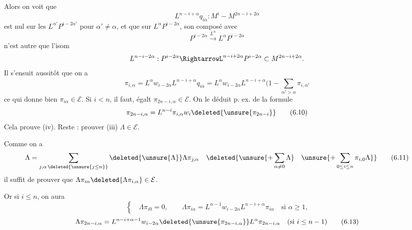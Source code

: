 Alors on voit que
\[
L^{n-i+\alpha}q_{i\alpha}:M^i-M^{2n-i+2\alpha}
\]
est nul sur les $L^{\alpha'}P^{i-2\alpha'}$ pour $\alpha'\neq\alpha$, et que sur $L^\alpha P^{i-2\alpha}$,  son composé avec
\[
P^{i-2\alpha}\xrightarrow{L^\alpha}L^\alpha P^{i-2\alpha}
\]
n'est autre que l'isom
\[
L^{n-i-2\alpha}:P^{i-2\alpha}\RightarrowL^{n-i+2\alpha}P^{i-2\alpha}\subset M^{2n-i+2\alpha}.
\]
Il s'ensuit aussitôt que on a
\[
\pi_{i,\alpha}=L^\alpha w_{i-2\alpha}L^{n-i+\alpha}q_{i\alpha}=L^\alpha w_{i-2\alpha}L^{n-i+\alpha}(1-\sum_{\alpha'>\alpha}\pi_{i,\alpha'}
\tag{6.9}
\]
ce qui donne bien $\pi_{i\alpha}\in\mathcal E$. 
Si $i<n$, il faut, égalt $\pi_{2n-i,\alpha}\in\mathcal E$. On
le déduit p. ex. de la formule
\[
\pi_{2n-i,\alpha}=L^{n-i}\pi_{i,\alpha}w_i\deleted{\unsure{\pi_{2n-i}}}
\tag{6.10}
\]
Cela prouve  (iv). Reste : prouver (iii) $\Lambda\in\mathcal E$.

Comme on a
\[
\Lambda=\sum_{j,\alpha\,\deleted{\unsure{j\leq n}}}\deleted{\unsure{\Lambda}}\Lambda\pi_{j,\alpha}\quad\deleted{\unsure{+\sum_{\alpha\neq0}\Lambda}\quad\unsure{+\sum_{0\leq i\leq n}\pi_{i,0}\Lambda}}
\tag{6.11}
\]
il suffit de prouver que $\Lambda\pi_{i\alpha}\deleted{\Lambda\pi_{i,\alpha}}\in\mathcal E$.

Or si $i\leq n$, on aura
\[
\left\{\quad\Lambda\pi_{i0}=0,\qquad\Lambda\pi_{i\alpha}=L^{\alpha-1}w_{i-2\alpha}L^{n-i+\alpha}\pi_{i\alpha}\quad\text{si }\alpha\geq1,\right.
\tag{6.12}
\]
\[
\Lambda\pi_{2n-i,\alpha}=L^{n-i+\alpha-1}w_{i-2\alpha}\deleted{\unsure{\pi_{2n-i,\alpha}}}L^\alpha\pi_{2n-i,\alpha}\quad(\text{si }i\leq n-1)
\tag{6.13}
\]

